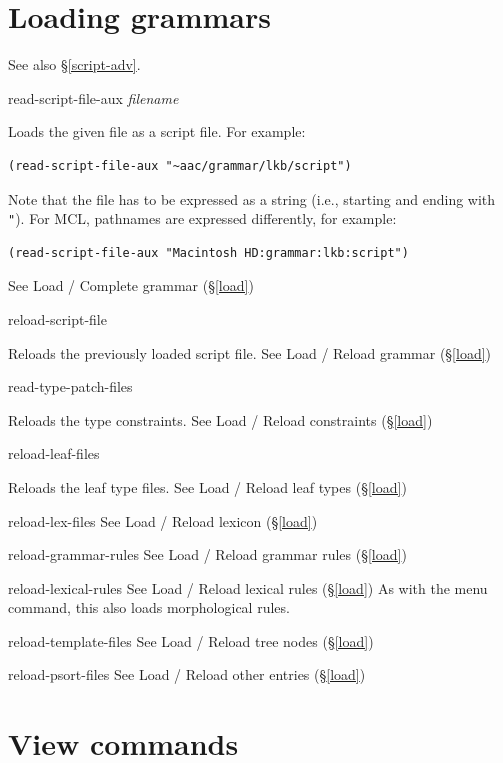 \documentclass[12pt]{report}
\newcommand{\lispcommand}[1]{\noindent\rm #1}%
\newcommand{\lkbmenucommand}{{\bf}}
\begin{document}
\section{Loading grammars}

See also \S\ref{script-adv}.

\lispcommand{read-script-file-aux {\it filename}}

Loads the given file as a script file.
For example: 
\begin{verbatim}
(read-script-file-aux "~aac/grammar/lkb/script")
\end{verbatim}
Note that the file has to be expressed as a string
(i.e., starting and ending with {\tt "}).
For MCL, pathnames are expressed differently, for example:
\begin{verbatim}
(read-script-file-aux "Macintosh HD:grammar:lkb:script")
\end{verbatim}
See {\lkbmenucommand Load} / {\lkbmenucommand Complete grammar} (\S\ref{load})

\lispcommand{reload-script-file}

Reloads the previously loaded script file.
See {\lkbmenucommand Load} / {\lkbmenucommand Reload grammar} (\S\ref{load})

\lispcommand{read-type-patch-files}

Reloads the type constraints.
See {\lkbmenucommand Load} / {\lkbmenucommand Reload constraints} (\S\ref{load})

\lispcommand{reload-leaf-files}

Reloads the leaf type files.
See {\lkbmenucommand Load} / {\lkbmenucommand Reload leaf types} (\S\ref{load})

\lispcommand{reload-lex-files}
See {\lkbmenucommand Load} / {\lkbmenucommand Reload lexicon} (\S\ref{load})

\lispcommand{reload-grammar-rules}
See {\lkbmenucommand Load} / {\lkbmenucommand Reload grammar rules} (\S\ref{load})

\lispcommand{reload-lexical-rules}
See {\lkbmenucommand Load} / {\lkbmenucommand Reload lexical rules} (\S\ref{load})
As with the menu command, this also loads morphological rules.

\lispcommand{reload-template-files}
See {\lkbmenucommand Load} / {\lkbmenucommand Reload tree nodes} (\S\ref{load})

\lispcommand{reload-psort-files}
See {\lkbmenucommand Load} / {\lkbmenucommand Reload other entries} (\S\ref{load})


\section{View commands}
\end{document}
